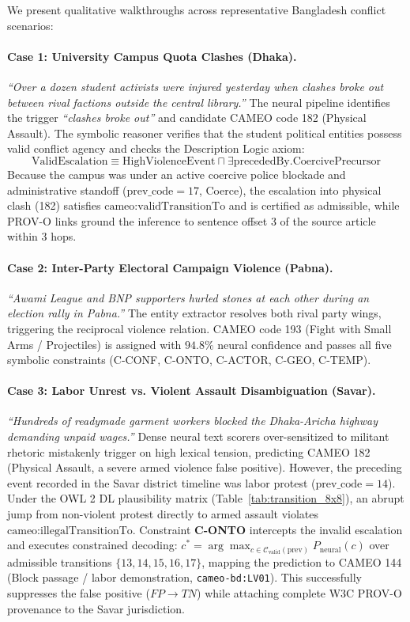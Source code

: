 \documentclass[11pt,a4paper]{article}
\begin{document}
We present qualitative walkthroughs across representative Bangladesh conflict scenarios:

\paragraph{Case 1: University Campus Quota Clashes (Dhaka).}
\textit{``Over a dozen student activists were injured yesterday when clashes broke out between rival factions outside the central library.''}
The neural pipeline identifies the trigger \textit{``clashes broke out''} and candidate CAMEO code 182 (Physical Assault).
The symbolic reasoner verifies that the student political entities possess valid conflict agency and checks the Description Logic axiom:
$$\text{ValidEscalation} \equiv \text{HighViolenceEvent} \sqcap \exists \text{precededBy}.\text{CoercivePrecursor}$$
Because the campus was under an active coercive police blockade and administrative standoff ($\text{prev\_code} = 17$, Coerce), the escalation into physical clash (182) satisfies $\text{cameo:validTransitionTo}$ and is certified as admissible, while PROV-O links ground the inference to sentence offset 3 of the source article within 3 hops.

\paragraph{Case 2: Inter-Party Electoral Campaign Violence (Pabna).}
\textit{``Awami League and BNP supporters hurled stones at each other during an election rally in Pabna.''}
The entity extractor resolves both rival party wings, triggering the reciprocal violence relation.
CAMEO code 193 (Fight with Small Arms / Projectiles) is assigned with $94.8\%$ neural confidence and passes all five symbolic constraints (C-CONF, C-ONTO, C-ACTOR, C-GEO, C-TEMP).

\paragraph{Case 3: Labor Unrest vs. Violent Assault Disambiguation (Savar).}
\textit{``Hundreds of readymade garment workers blocked the Dhaka-Aricha highway demanding unpaid wages.''}
Dense neural text scorers over-sensitized to militant rhetoric mistakenly trigger on high lexical tension, predicting CAMEO 182 (Physical Assault, a severe armed violence false positive).
However, the preceding event recorded in the Savar district timeline was labor protest ($\text{prev\_code} = 14$).
Under the OWL 2 DL plausibility matrix (Table~\ref{tab:transition_8x8}), an abrupt jump from non-violent protest directly to armed assault violates $\text{cameo:illegalTransitionTo}$.
Constraint \textbf{C-ONTO} intercepts the invalid escalation and executes constrained decoding:
$c^* = \arg\max_{c \in \mathcal{C}_{\text{valid}}(\text{prev})} P_{\text{neural}}(c)$ over admissible transitions $\{13, 14, 15, 16, 17\}$,
mapping the prediction to CAMEO 144 (Block passage / labor demonstration, \texttt{cameo-bd:LV01}).
This successfully suppresses the false positive ($FP \to TN$) while attaching complete W3C PROV-O provenance to the Savar jurisdiction.
\end{document}
